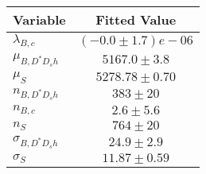 \begin{tabular}[t]{lc}
\hline
Variable &Fitted Value\\
\hline\hline
$\lambda_{B,c}$&$(-0.0\pm1.7)e-06$\\
\hline
$\mu_{B, D^* D_s h}$&$5167.0\pm3.8$\\
\hline
$\mu_S$&$5278.78\pm0.70$\\
\hline
$n_{B, D^* D_s h}$&$383\pm20$\\
\hline
$n_{B,c}$&$2.6\pm5.6$\\
\hline
$n_S$&$764\pm20$\\
\hline
$\sigma_{B, D^* D_s h}$&$24.9\pm2.9$\\
\hline
$\sigma_S$&$11.87\pm0.59$\\
\hline
\end{tabular}
